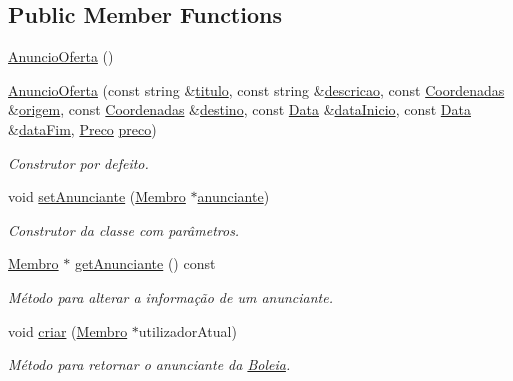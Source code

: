 \subsection*{Public Member Functions}
\begin{DoxyCompactItemize}
\item 
\hyperlink{class_anuncio_oferta_a5828e85f76169ec6b3a5b51fabe42d1c}{Anuncio\+Oferta} ()
\item 
\hyperlink{class_anuncio_oferta_a1bc1fd4199b766b00e7234385732720f}{Anuncio\+Oferta} (const string \&\hyperlink{class_anuncio_adb34bedd8220f42b9ee37662c21313e6}{titulo}, const string \&\hyperlink{class_anuncio_aa6a9eb8d08cb06d16061b006eb2c8b97}{descricao}, const \hyperlink{class_coordenadas}{Coordenadas} \&\hyperlink{class_anuncio_a9b3f8ac29ebf2a44e24ea2273064a7f5}{origem}, const \hyperlink{class_coordenadas}{Coordenadas} \&\hyperlink{class_anuncio_acdac86595f84cfb8a2bf54c414857168}{destino}, const \hyperlink{class_data}{Data} \&\hyperlink{class_anuncio_abeb7d8c5fe5e7d127005044981a3cd3d}{data\+Inicio}, const \hyperlink{class_data}{Data} \&\hyperlink{class_anuncio_ac3b9182cc541cb68215f8aa09fb0e11a}{data\+Fim}, \hyperlink{class_preco}{Preco} \hyperlink{class_anuncio_aa780fd8e07586a3af117fd20593fb1b4}{preco})
\begin{DoxyCompactList}\small\item\em Construtor por defeito. \end{DoxyCompactList}\item 
void \hyperlink{class_anuncio_oferta_a2bb132a1679d5a51edf54ac823bb9c4e}{set\+Anunciante} (\hyperlink{class_membro}{Membro} $\ast$\hyperlink{class_anuncio_a58250bfc8ab82d4308839b1e26213a0f}{anunciante})
\begin{DoxyCompactList}\small\item\em Construtor da classe com parâmetros. \end{DoxyCompactList}\item 
\hyperlink{class_membro}{Membro} $\ast$ \hyperlink{class_anuncio_oferta_a517173f7de8f7952e402e58b8b5d19b9}{get\+Anunciante} () const 
\begin{DoxyCompactList}\small\item\em Método para alterar a informação de um anunciante. \end{DoxyCompactList}\item 
void \hyperlink{class_anuncio_oferta_a796d66969f1f391fc62685ad8e6c81cb}{criar} (\hyperlink{class_membro}{Membro} $\ast$utilizador\+Atual)
\begin{DoxyCompactList}\small\item\em Método para retornar o anunciante da \hyperlink{class_boleia}{Boleia}. \end{DoxyCompactList}\item 

\end{DoxyCompactItemize}
